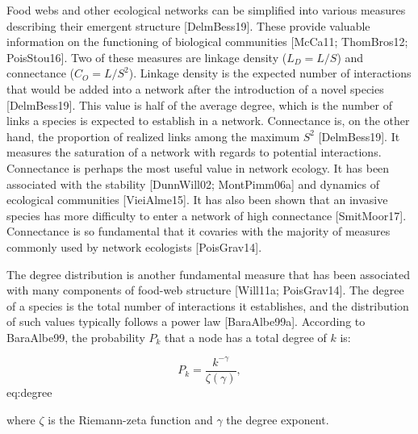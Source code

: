 Food webs and
other ecological networks can be simplified into various measures describing
their emergent structure [DelmBess19]. These provide valuable information on
the functioning of biological communities [McCa11; ThomBros12; PoisStou16].
Two of these measures are linkage density ($L_D = L/S$) and connectance ($C_O =
L/S^2$). Linkage density is the expected number of interactions that would be
added into a network after the introduction of a novel species [DelmBess19].
This value is half of the average degree, which is the number of links a species
is expected to establish in a network. Connectance is, on the other hand, the
proportion of realized links among the maximum $S^2$ [DelmBess19]. It measures
the saturation of a network with regards to potential interactions. Connectance
is perhaps the most useful value in network ecology. It has been associated with
the stability [DunnWill02; MontPimm06a] and dynamics of ecological communities
[VieiAlme15]. It has also been shown that an invasive species has more
difficulty to enter a network of high connectance [SmitMoor17]. Connectance is
so fundamental that it covaries with the majority of measures commonly used by
network ecologists [PoisGrav14].

The degree distribution is another fundamental measure that has been associated
with many components of food-web structure [Will11a; PoisGrav14]. The degree
of a species is the total number of interactions it establishes, and the
distribution of such values typically follows a power law [BaraAlbe99a].
According to BaraAlbe99, the probability $P_k$ that a node has a total degree
of $k$ is:

$$ P_k = \frac{k^{-\gamma}}{\zeta(\gamma)},$$ {eq:degree}

where $\zeta$ is the Riemann-zeta function and $\gamma$ the degree exponent.

